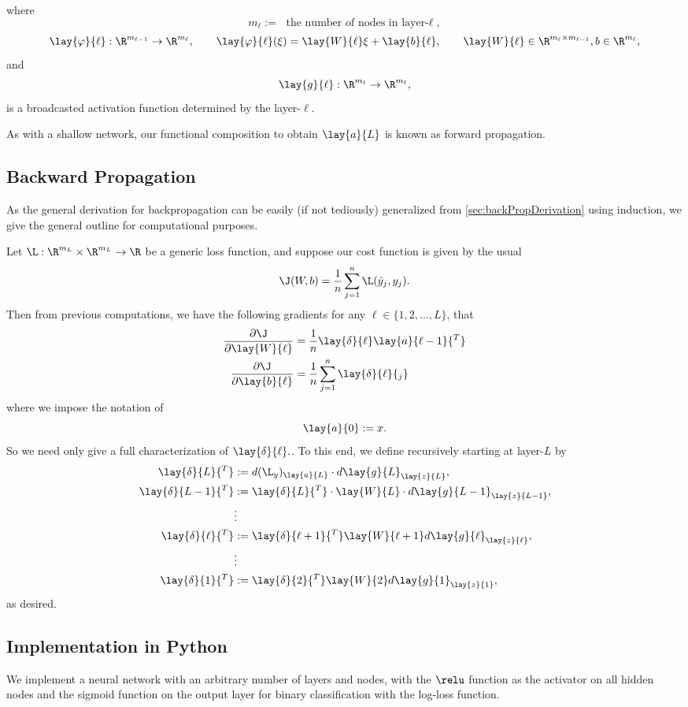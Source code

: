 where
$$m_\ell :=\text{ the number of nodes in layer-$\ell$},$$
$$\lay{\varphi}{\ell}:\R^{m_{\ell-1}}\to\R^{m_\ell},\qquad \lay{\varphi}{\ell}(\xi)=\lay{W}{\ell}\xi+\lay{b}{\ell},\qquad \lay{W}{\ell}\in\R^{m_\ell\times m_{\ell-1}},b\in\R^{m_\ell},$$
and
$$\lay{g}{\ell}:\R^{m_\ell}\to\R^{m_\ell},$$
is a broadcasted activation function determined by the layer-$\ell$.

As with a shallow network, our functional composition to obtain $\lay{a}{L}$ is known as forward propagation.

\subsection{Backward Propagation}
As the general derivation for backpropagation can be easily (if not tediously) generalized from \cref{sec:backPropDerivation} using induction, we give the general outline for computational purposes.

Let $\L:\R^{m_L}\times\R^{m_L}\to\R$ be a generic loss function, and suppose our cost function is given by the usual
$$\J(W,b)=\frac{1}{n}\sum_{j=1}^n\L(\hat{y}_j,y_j).$$
Then from previous computations, we have the following gradients for any $\ell\in\{1,2,...,L\}$, that
\begin{align*}
	\frac{\partial\J}{\partial\lay{W}{\ell}}&=\frac{1}{n}\lay{\delta}{\ell}\lay{a}{\ell-1}{^T}\\
	\frac{\partial\J}{\partial\lay{b}{\ell}}&=\frac{1}{n}\sum_{j=1}^n\lay{\delta}{\ell}{_j}
\end{align*}
where we impose the notation of
$$\lay{a}{0}:=x.$$
So we need only give a full characterization of $\lay{\delta}{\ell}.$. To this end, we define recursively starting at layer-$L$ by
\begin{align*}
	\lay{\delta}{L}{^T}&:=d(\L_y)_{\lay{a}{L}}\cdot d\lay{g}{L}_{\lay{z}{L}},\\
	\lay{\delta}{L-1}{^T}&:=\lay{\delta}{L}{^T}\cdot\lay{W}{L}\cdot d\lay{g}{L-1}_{\lay{z}{L-1}},\\
	&\vdots\\
	\lay{\delta}{\ell}{^T}&:=\lay{\delta}{\ell+1}{^T}\lay{W}{\ell+1}d\lay{g}{\ell}_{\lay{z}{\ell}},\\
	&\vdots\\
	\lay{\delta}{1}{^T}&:=\lay{\delta}{2}{^T}\lay{W}{2}d\lay{g}{1}_{\lay{z}{1}},
\end{align*}
as desired.



\subsection{Implementation in Python}
We implement a neural network with an arbitrary number of layers and nodes, with the $\relu$ function as the activator on all hidden nodes and the sigmoid function on the output layer for binary classification with the log-loss function.

